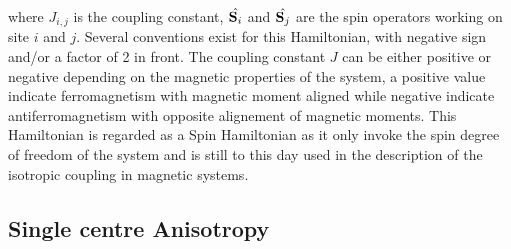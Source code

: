 \documentclass[12pt]{article}
\numberwithin{equation}{section}
\begin{document}
where $J_{i,j}$ is the coupling constant, $\hat{\vb S_i}$ and $\hat{\vb S_j}$ are the spin operators working on site $i$ and $j$.
Several conventions exist for this Hamiltonian, with negative sign and/or a factor of 2 in front.  
The coupling constant $J$ can be either positive or negative depending on the magnetic properties of the system, a positive value indicate ferromagnetism with magnetic moment aligned while negative indicate antiferromagnetism with opposite alignement of magnetic moments.
This Hamiltonian is regarded as a Spin Hamiltonian as it only invoke the spin degree of freedom of the system and is still to this day used in the description of the isotropic coupling in magnetic systems.


\subsection{Single centre Anisotropy}
\end{document}

